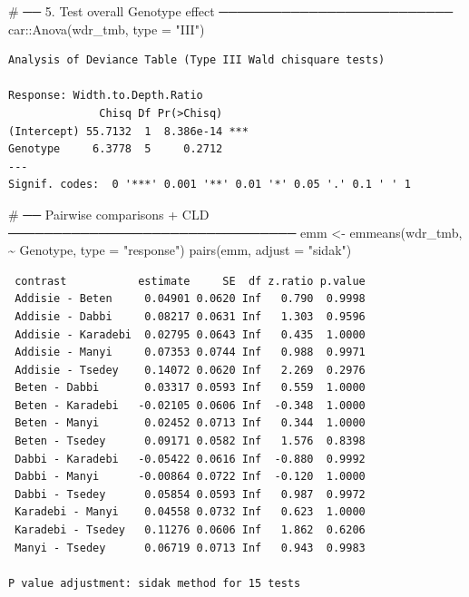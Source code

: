 \documentclass[
  letterpaper,
  DIV=11,
  numbers=noendperiod]{scrartcl}
\newenvironment{Shaded}{\begin{snugshade}}{\end{snugshade}}
\newcommand{\AttributeTok}[1]{\textcolor[rgb]{0.40,0.45,0.13}{#1}}
\newcommand{\CommentTok}[1]{\textcolor[rgb]{0.37,0.37,0.37}{#1}}
\newcommand{\FunctionTok}[1]{\textcolor[rgb]{0.28,0.35,0.67}{#1}}
\newcommand{\NormalTok}[1]{\textcolor[rgb]{0.00,0.23,0.31}{#1}}
\newcommand{\OtherTok}[1]{\textcolor[rgb]{0.00,0.23,0.31}{#1}}
\newcommand{\SpecialCharTok}[1]{\textcolor[rgb]{0.37,0.37,0.37}{#1}}
\newcommand{\StringTok}[1]{\textcolor[rgb]{0.13,0.47,0.30}{#1}}
\begin{document}
\begin{Shaded}
\begin{Highlighting}[]
\CommentTok{\# ── 5. Test overall Genotype effect ──────────────────────────}
\NormalTok{car}\SpecialCharTok{::}\FunctionTok{Anova}\NormalTok{(wdr\_tmb, }\AttributeTok{type =} \StringTok{"III"}\NormalTok{)}
\end{Highlighting}
\end{Shaded}

\begin{verbatim}
Analysis of Deviance Table (Type III Wald chisquare tests)

Response: Width.to.Depth.Ratio
              Chisq Df Pr(>Chisq)    
(Intercept) 55.7132  1  8.386e-14 ***
Genotype     6.3778  5     0.2712    
---
Signif. codes:  0 '***' 0.001 '**' 0.01 '*' 0.05 '.' 0.1 ' ' 1
\end{verbatim}

\begin{Shaded}
\begin{Highlighting}[]
\CommentTok{\# ── Pairwise comparisons + CLD ────────────────────────────────}
\NormalTok{emm }\OtherTok{\textless{}{-}} \FunctionTok{emmeans}\NormalTok{(wdr\_tmb, }\SpecialCharTok{\textasciitilde{}}\NormalTok{ Genotype, }\AttributeTok{type =} \StringTok{"response"}\NormalTok{)}
\FunctionTok{pairs}\NormalTok{(emm, }\AttributeTok{adjust =} \StringTok{"sidak"}\NormalTok{)}
\end{Highlighting}
\end{Shaded}

\begin{verbatim}
 contrast           estimate     SE  df z.ratio p.value
 Addisie - Beten     0.04901 0.0620 Inf   0.790  0.9998
 Addisie - Dabbi     0.08217 0.0631 Inf   1.303  0.9596
 Addisie - Karadebi  0.02795 0.0643 Inf   0.435  1.0000
 Addisie - Manyi     0.07353 0.0744 Inf   0.988  0.9971
 Addisie - Tsedey    0.14072 0.0620 Inf   2.269  0.2976
 Beten - Dabbi       0.03317 0.0593 Inf   0.559  1.0000
 Beten - Karadebi   -0.02105 0.0606 Inf  -0.348  1.0000
 Beten - Manyi       0.02452 0.0713 Inf   0.344  1.0000
 Beten - Tsedey      0.09171 0.0582 Inf   1.576  0.8398
 Dabbi - Karadebi   -0.05422 0.0616 Inf  -0.880  0.9992
 Dabbi - Manyi      -0.00864 0.0722 Inf  -0.120  1.0000
 Dabbi - Tsedey      0.05854 0.0593 Inf   0.987  0.9972
 Karadebi - Manyi    0.04558 0.0732 Inf   0.623  1.0000
 Karadebi - Tsedey   0.11276 0.0606 Inf   1.862  0.6206
 Manyi - Tsedey      0.06719 0.0713 Inf   0.943  0.9983

P value adjustment: sidak method for 15 tests 
\end{verbatim}
\end{document}
